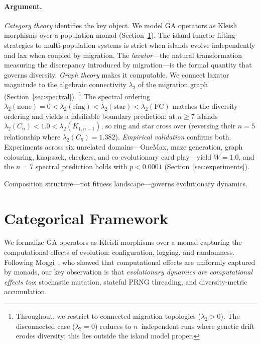 \documentclass[submission,copyright,creativecommons]{eptcs}
\begin{document}
\paragraph{Argument.}
\emph{Category theory} identifies the key object.  We model GA
operators as Kleisli morphisms over a population monad
(Section~\ref{sec:framework}).  The island functor lifting strategies
to multi-population systems is strict when islands evolve independently
and lax when coupled by migration.  The \emph{laxator}---the natural
transformation measuring the discrepancy introduced by migration---is
the formal quantity that governs diversity.  \emph{Graph theory} makes
it computable.  We connect laxator magnitude to the algebraic
connectivity $\lambda_2$ of the migration graph
(Section~\ref{sec:spectral}).%
\footnote{Throughout, we restrict to connected migration topologies
($\lambda_2 > 0$). The disconnected case ($\lambda_2 = 0$) reduces to
$n$~independent runs where genetic drift erodes diversity; this lies
outside the island model proper.}
The spectral ordering $\lambda_2(\text{none}) = 0 < \lambda_2(\text{ring})
< \lambda_2(\text{star}) < \lambda_2(\text{FC})$ matches the diversity
ordering and yields a falsifiable boundary prediction: at
$n \geq 7$ islands $\lambda_2(C_n) < 1.0 < \lambda_2(K_{1,n-1})$,
so ring and star cross over (reversing their $n{=}5$ relationship where
$\lambda_2(C_5) = 1.382$).  \emph{Empirical validation} confirms both.
Experiments across six unrelated domains---OneMax, maze generation,
graph colouring, knapsack, checkers, and co-evolutionary card play---yield
$W = 1.0$, and the $n{=}7$ spectral prediction holds with
$p < 0.0001$ (Section~\ref{sec:experiments}).

Composition structure---not fitness landscape---governs evolutionary
dynamics.

\section{Categorical Framework}
\label{sec:framework}

We formalize GA operators as Kleisli morphisms over a monad capturing
the computational effects of evolution: configuration, logging, and
randomness. Following Moggi~\cite{moggi1991notions}, who showed that
computational effects are uniformly captured by monads, our key
observation is that \emph{evolutionary dynamics are computational
effects too}: stochastic mutation, stateful PRNG threading, and
diversity-metric accumulation.
\end{document}
